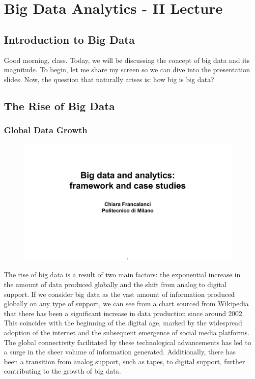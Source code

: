 \section{Big Data Analytics - II Lecture}

\subsection{Introduction to Big Data}

Good morning, class. Today, we will be discussing the concept of big
data and its magnitude. To begin, let me share my screen so we can dive
into the presentation slides. Now, the question that naturally arises
is: how big is big data?

\subsection{The Rise of Big Data}

\subsubsection{Global Data Growth}

\begin{figure}[!h]
  \centering
  \includegraphics[page=26, trim = 1.3cm 0.7cm 1.5cm 3.5cm, clip, width=\imagewidth]{images/06 - BIG_DATA.pdf}
\end{figure}

The rise of big data is a result of two main factors: the exponential
increase in the amount of data produced globally and the shift from
analog to digital support. If we consider big data as the vast amount of
information produced globally on any type of support, we can see from a
chart sourced from Wikipedia that there has been a significant increase
in data production since around 2002. This coincides with the beginning
of the digital age, marked by the widespread adoption of the internet
and the subsequent emergence of social media platforms. The global
connectivity facilitated by these technological advancements has led to
a surge in the sheer volume of information generated. Additionally,
there has been a transition from analog support, such as tapes, to
digital support, further contributing to the growth of big data.


